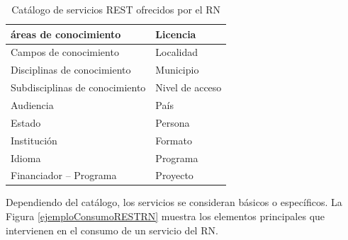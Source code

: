 \begin{table}[htbp]
\caption{Cat\'alogo de servicios REST ofrecidos por el RN} %
\begin{tabular}{| p{7cm}| p{7cm} |} \hline
\'areas de conocimiento          & Licencia                       \\ \hline
Campos de conocimiento         & Localidad                      \\ \hline
Disciplinas de conocimiento    & Municipio                      \\ \hline
Subdisciplinas de conocimiento & Nivel de acceso                \\ \hline
Audiencia                      & Pa\'is                           \\ \hline
Estado                         & Persona                        \\ \hline
Instituci\'on                    & Formato                        \\ \hline
Idioma                         & Programa                       \\ \hline
Financiador – Programa         & Proyecto                       \\ \hline
\end{tabular}

\label{descripcionserviciosRESTRN}
\end{table}



Dependiendo del cat\'alogo, los servicios se consideran b\'asicos o espec\'ificos. La Figura \ref{ejemploConsumoRESTRN} muestra los elementos principales que intervienen en el consumo de un servicio del RN.\newline

